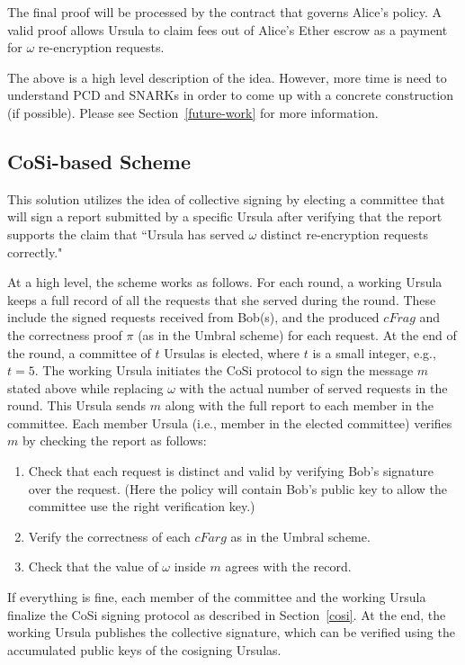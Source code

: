 The final proof will be processed by the contract that governs Alice's policy. A valid proof 
allows Ursula to claim fees out of Alice's Ether escrow as a payment for $\omega$ re-encryption  
requests.


The above is a high level description of the idea. However, more time is need to 
understand PCD and SNARKs in order to come up with a concrete construction 
(if possible). Please see Section~\ref{future-work} for more information.


\subsection{CoSi-based Scheme}
This solution utilizes the idea of collective signing by electing a committee 
that will sign a report submitted by a specific Ursula after verifying that 
the report supports the claim that ``Ursula has served $\omega$ distinct 
re-encryption requests correctly." 


At a high level, the scheme works as follows. For each round, a working Ursula keeps 
a full record of all the requests that she served during the round. These 
include the signed requests received from Bob(s), and the produced $cFrag$ 
and the correctness proof $\pi$ (as in the Umbral scheme) for 
each request. At the end of the round, a committee of $t$ Ursulas is 
elected, where $t$ is a small integer, e.g., $t = 5$. The working Ursula 
initiates the CoSi protocol to sign the message $m$ stated above while 
replacing $\omega$ with the actual number of served 
requests in the round. This Ursula sends $m$ along with the full report to 
each member in the committee. Each member Ursula (i.e., member in the 
elected committee) verifies $m$ by checking the report as follows:
\begin{enumerate}
\setlength{\itemsep}{0pt}
\item Check that each request is distinct and valid by verifying Bob's 
signature over the request. (Here the policy will contain Bob's public 
key to allow the committee use the right verification key.)

\item Verify the correctness of each $cFarg$ as in the Umbral 
scheme.

\item Check that the value of $\omega$ inside $m$ agrees with the 
record.
\end{enumerate}


If everything is fine, each member of the committee and the working 
Ursula finalize the CoSi signing protocol as described in Section~\ref{cosi}. 
At the end, the working Ursula publishes the collective signature, which can be 
verified using the accumulated public keys of the cosigning Ursulas.


